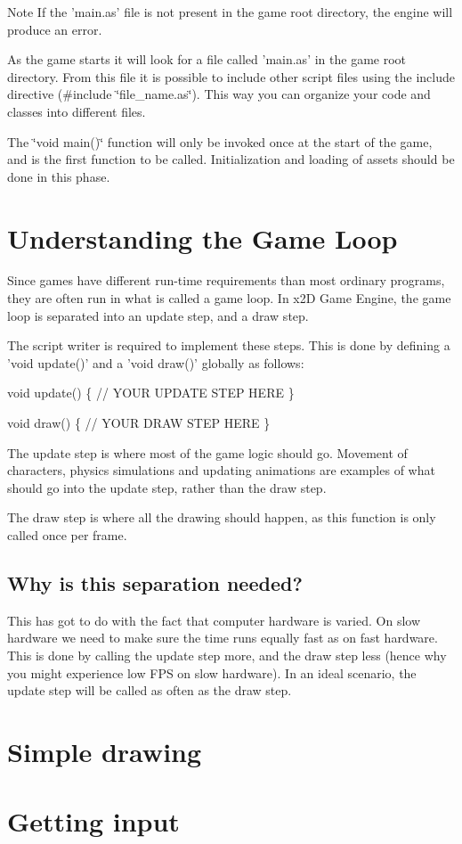 \begin{DoxyNote}{Note}
If the 'main.\+as' file is not present in the game root directory, the engine will produce an error.

As the game starts it will look for a file called 'main.\+as' in the game root directory. From this file it is possible to include other script files using the include directive (\#include \char`\"{}file\+\_\+name.\+as\char`\"{}). This way you can organize your code and classes into different files.

The \char`\"{}void main()\char`\"{} function will only be invoked once at the start of the game, and is the first function to be called. Initialization and loading of assets should be done in this phase. 
\end{DoxyNote}
\hypertarget{gameloop}{}\section{Understanding the Game Loop}\label{gameloop}
Since games have different run-\/time requirements than most ordinary programs, they are often run in what is called a game loop. In x2\+D Game Engine, the game loop is separated into an update step, and a draw step.

The script writer is required to implement these steps. This is done by defining a 'void update()' and a 'void draw()' globally as follows\+:


\begin{DoxyCode}
\textcolor{keywordtype}{void} update()
\{
    \textcolor{comment}{// YOUR UPDATE STEP HERE}
\}

\textcolor{keywordtype}{void} draw()
\{
    \textcolor{comment}{// YOUR DRAW STEP HERE}
\}
\end{DoxyCode}


The update step is where most of the game logic should go. Movement of characters, physics simulations and updating animations are examples of what should go into the update step, rather than the draw step.

The draw step is where all the drawing should happen, as this function is only called once per frame.\hypertarget{gameloop_why_step}{}\subsection{Why is this separation needed?}\label{gameloop_why_step}
This has got to do with the fact that computer hardware is varied. On slow hardware we need to make sure the time runs equally fast as on fast hardware. This is done by calling the update step more, and the draw step less (hence why you might experience low F\+P\+S on slow hardware). In an ideal scenario, the update step will be called as often as the draw step. \hypertarget{drawing}{}\section{Simple drawing}\label{drawing}
\hypertarget{input}{}\section{Getting input}\label{input}

